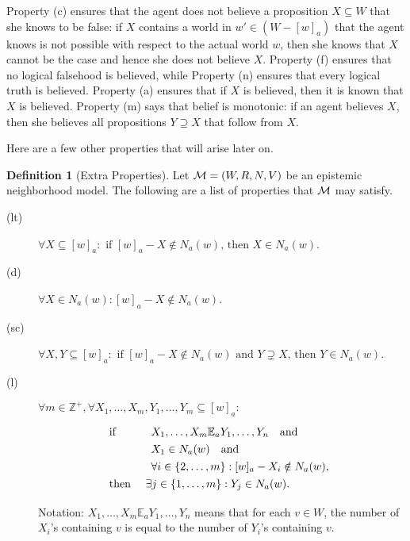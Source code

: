 \documentclass[12pt]{article}
\theoremstyle{definition}
\newtheorem{definition}[theorem]{Definition}
\newcommand{\Int}{\mathbb{Z}}  %
\newcommand{\M}{{\cal M}}      %
\begin{document}
Property (c) ensures that the agent does not believe a proposition
$X\subseteq W$ that she knows to be false: if $X$ contains a world in
$w'\in(W-[w]_a)$ that the agent knows is not possible with respect to
the actual world $w$, then she knows that $X$ cannot be the case and
hence she does not believe $X$.  Property (f) ensures that no logical
falsehood is believed, while Property (n) ensures that every logical
truth is believed.  Property (a) ensures that if $X$ is believed, then
it is known that $X$ is believed.  Property (m) says that belief is
monotonic: if an agent believes $X$, then she believes all
propositions $Y\supseteq X$ that follow from $X$.

Here are a few other properties that will arise later on.

\begin{definition}[Extra Properties]
  \label{definition:extra-properties}
  Let $\M=(W,R,N,V)$ be an epistemic neighborhood model.  The
  following are a list of properties that $\M$ may satisfy.
  \begin{description}
  \item[(lt)] $\forall X\subseteq[w]_a: \text{ if } [w]_a-X\notin
    N_a(w) \text{, then } X\in N_a(w)$.

  \item[(d)] $\forall X \in N_a(w): [w]_a - X \notin  N_a(w)$.

  \item[(sc)] $\forall X,Y\subseteq[w]_a: \text{ if } [w]_a-X\notin
    N_a(w) \text{ and } Y\supsetneq X \text{, then } Y\in N_a(w)$.

  \item[(l)] $\forall m\in\Int^+,\forall
    X_1,\dots,X_m,Y_1,\dots,Y_m\subseteq[w]_a:$
    \[
    \renewcommand{\arraystretch}{1.3}
    \begin{array}{ll}
      \text{if }
      &
      \begin{array}[t]{l}
        X_1,\dots,X_m\mathbb{E}_aY_1,\dots,Y_n \quad\text{and}
        \\
        X_1\in N_a(w) \quad\text{and}
        \\{}
        \forall i\in\{2,\dots,m\}:
        [w]_a-X_i\notin N_a(w) \text{,}
      \end{array}
      \\
      \text{then }
      &
      \exists j\in\{1,\dots,m\}: Y_j\in N_a(w)\text{.}
    \end{array}
    \]

    Notation: $X_1,\dots,X_m\mathbb{E}_aY_1,\dots,Y_n$ means that for
    each $v\in W$, the number of $X_i$'s containing $v$ is equal to
    the number of $Y_i$'s containing $v$.


\end{description}
\end{definition}
\end{document}
